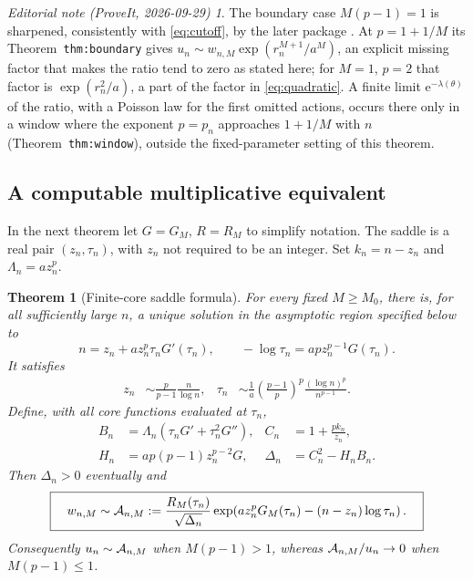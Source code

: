 \documentclass[11pt,a4paper]{article}
\numberwithin{equation}{section}
\newtheorem{theorem}{Theorem}[section]
\theoremstyle{definition}
\theoremstyle{remark}
\newtheorem*{ednote}{Editorial note (ProveIt, 2026-09-29)}
\newcommand{\ee}{\mathrm e}\newcommand{\dd}{\mathrm d}
\begin{document}
\begin{ednote}
The boundary case $M(p-1)=1$ is sharpened, consistently with
\eqref{eq:cutoff}, by the later package \cite{ed:plb}. At $p=1+1/M$ its
Theorem~\texttt{thm:boundary} gives
$u_n\sim w_{n,M}\exp(r_n^{M+1}/a^M)$, an explicit missing factor that
makes the ratio tend to zero as stated here; for $M=1$, $p=2$ that factor
is $\exp(r_n^2/a)$, a part of the factor in \eqref{eq:quadratic}. A finite
limit $\ee^{-\lambda(\theta)}$ of the ratio, with a Poisson law for the
first omitted actions, occurs there only in a window where the exponent
$p=p_n$ approaches $1+1/M$ with $n$ (Theorem~\texttt{thm:window}), outside
the fixed-parameter setting of this theorem.
\end{ednote}

\subsection{A computable multiplicative equivalent}

In the next theorem let $G=G_M$, $R=R_M$ to simplify notation.
The saddle is a real pair $(z_n,\tau_n)$, with $z_n$ not required to be an
integer. Set $k_n=n-z_n$ and $\Lambda_n=a z_n^p$.

\begin{theorem}[Finite-core saddle formula]
\label{thm:saddle}
For every fixed $M\ge M_0$, there is, for all sufficiently large $n$, a
unique solution in the asymptotic region specified below to
\begin{equation}
 \boxed{\qquad
 n=z_n+a z_n^p\tau_nG'(\tau_n),\qquad
 -\log\tau_n=apz_n^{p-1}G(\tau_n).
 \qquad}
 \label{eq:saddle}
\end{equation}
It satisfies
\begin{align}
 z_n&\sim\frac{p}{p-1}\frac{n}{\log n},
 &\tau_n&\sim \frac1a\left(\frac{p-1}{p}\right)^p
                   \frac{(\log n)^p}{n^{p-1}}.
 \label{eq:saddlescales}
\end{align}
Define, with all core functions evaluated at $\tau_n$,
\begin{align}
 B_n&=\Lambda_n(\tau_nG'+\tau_n^2G''),
 &C_n&=1+\frac{pk_n}{z_n},\\
 H_n&=ap(p-1)z_n^{p-2}G,
 &\Delta_n&=C_n^2-H_nB_n.
 \label{eq:determinant}
\end{align}
Then $\Delta_n>0$ eventually and
\begin{equation}
 \boxed{\quad
 w_{n,M}\sim\mathcal A_{n,M}:=
 \frac{R_M(\tau_n)}{\sqrt{\Delta_n}}
 \exp\!\left(a z_n^pG_M(\tau_n)-(n-z_n)\log\tau_n\right).
 \quad}
 \label{eq:full-equivalent}
\end{equation}
Consequently $u_n\sim\mathcal A_{n,M}$ when $M(p-1)>1$, whereas
$\mathcal A_{n,M}/u_n\to0$ when $M(p-1)\le1$.
\end{theorem}
\end{document}
